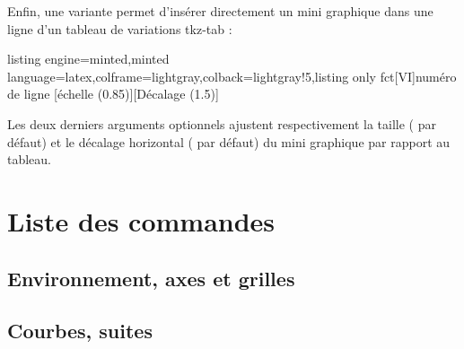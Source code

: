 \documentclass[11pt,a4paper]{ltxdoc}
\begin{document}
Enfin, une variante  permet d'insérer directement un mini graphique dans une ligne d'un tableau de variations \textsf{tkz-tab} :

\begin{tcblisting}{listing engine=minted,minted language=latex,colframe=lightgray,colback=lightgray!5,listing only}
%
  {fct}[VI]{numéro de ligne}%
  [échelle (0.85)][Décalage (1.5)]
\end{tcblisting}

Les deux derniers arguments optionnels ajustent respectivement la taille ( par défaut) et le décalage horizontal ( par défaut) du mini graphique par rapport au tableau.

\newpage

\section{Liste des commandes}

\NewDocumentCommand{}

\subsection{Environnement, axes et grilles}

\begin{description}[noitemsep]
\end{description}

\subsection{Courbes, suites}
\end{document}
